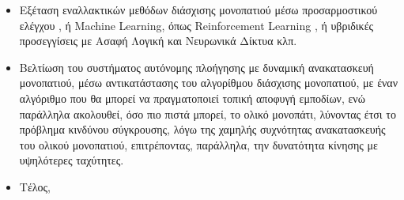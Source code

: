 \begin{itemize}
	\item Εξέταση εναλλακτικών μεθόδων διάσχισης μονοπατιού μέσω προσαρμοστικού ελέγχου \cite{offroad_adaptive_control}, ή Machine Learning, όπως Reinforcement Learning \cite{rl_ptc}, ή υβριδικές προσεγγίσεις με Ασαφή Λογική και Νευρωνικά Δίκτυα \cite{neural_and_fuzzy_navigation} κλπ.
	\item Βελτίωση του συστήματος αυτόνομης πλοήγησης με δυναμική ανακατασκευή μονοπατιού, μέσω αντικατάστασης του αλγορίθμου διάσχισης μονοπατιού, με έναν αλγόριθμο που θα μπορεί να πραγματοποιεί τοπική αποφυγή εμποδίων, ενώ παράλληλα ακολουθεί, όσο πιο πιστά μπορεί, το ολικό μονοπάτι, λύνοντας έτσι το πρόβλημα κινδύνου σύγκρουσης, λόγω της χαμηλής συχνότητας ανακατασκευής του ολικού μονοπατιού, επιτρέποντας, παράλληλα, την δυνατότητα κίνησης με υψηλότερες ταχύτητες.
	\item Τέλος, 
\end{itemize}





